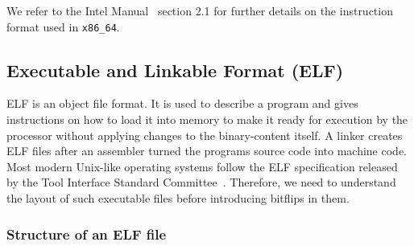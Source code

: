 We refer to the Intel Manual~\cite{intelsys} section 2.1 for further details on
the instruction format used in \texttt{x86\_64}.

\subsection{Executable and Linkable Format (ELF)}

ELF is an object file format. It is used to describe a program and gives
instructions on how to load it into memory to make it ready for execution
by the processor without applying changes to the binary-content itself. A
linker creates ELF files after an assembler turned the program\textquotesingle s
source code into machine code. Most modern Unix-like operating systems follow
the ELF specification released by the Tool Interface Standard
Committee~\cite{elfspec}. Therefore, we need to understand the layout of such
executable files before introducing bitflips in them.

\subsubsection{Structure of an ELF file}

